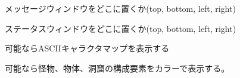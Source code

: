 \blist{}
\item[\ib{align\verb+_+message}]
メッセージウィンドウをどこに置くか(top, bottom, left, right)
\item[\ib{align\verb+_+status}]
ステータスウィンドウをどこに置くか(top, bottom, left, right)
\item[\ib{ascii\verb+_+map}]
可能ならASCIIキャラクタマップを表示する
\item[\ib{color}]
可能なら怪物、物体、洞窟の構成要素をカラーで表示する。

